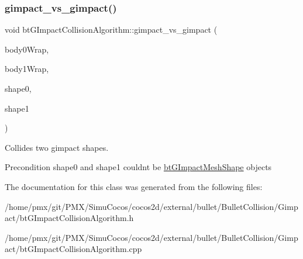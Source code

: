 \subsubsection{\texorpdfstring{gimpact\+\_\+vs\+\_\+gimpact()}{gimpact\_vs\_gimpact()}\hspace{0.1cm}{\footnotesize\ttfamily [2/2]}}
{\footnotesize\ttfamily void bt\+G\+Impact\+Collision\+Algorithm\+::gimpact\+\_\+vs\+\_\+gimpact (\begin{DoxyParamCaption}\item[{const \hyperlink{structbtCollisionObjectWrapper}{bt\+Collision\+Object\+Wrapper} $\ast$}]{body0\+Wrap,  }\item[{const \hyperlink{structbtCollisionObjectWrapper}{bt\+Collision\+Object\+Wrapper} $\ast$}]{body1\+Wrap,  }\item[{const \hyperlink{classbtGImpactShapeInterface}{bt\+G\+Impact\+Shape\+Interface} $\ast$}]{shape0,  }\item[{const \hyperlink{classbtGImpactShapeInterface}{bt\+G\+Impact\+Shape\+Interface} $\ast$}]{shape1 }\end{DoxyParamCaption})}



Collides two gimpact shapes. 

\begin{DoxyPrecond}{Precondition}
shape0 and shape1 couldn\textquotesingle{}t be \hyperlink{classbtGImpactMeshShape}{bt\+G\+Impact\+Mesh\+Shape} objects 
\end{DoxyPrecond}


The documentation for this class was generated from the following files\+:\begin{DoxyCompactItemize}
\item 
/home/pmx/git/\+P\+M\+X/\+Simu\+Cocos/cocos2d/external/bullet/\+Bullet\+Collision/\+Gimpact/bt\+G\+Impact\+Collision\+Algorithm.\+h\item 
/home/pmx/git/\+P\+M\+X/\+Simu\+Cocos/cocos2d/external/bullet/\+Bullet\+Collision/\+Gimpact/bt\+G\+Impact\+Collision\+Algorithm.\+cpp\end{DoxyCompactItemize}
